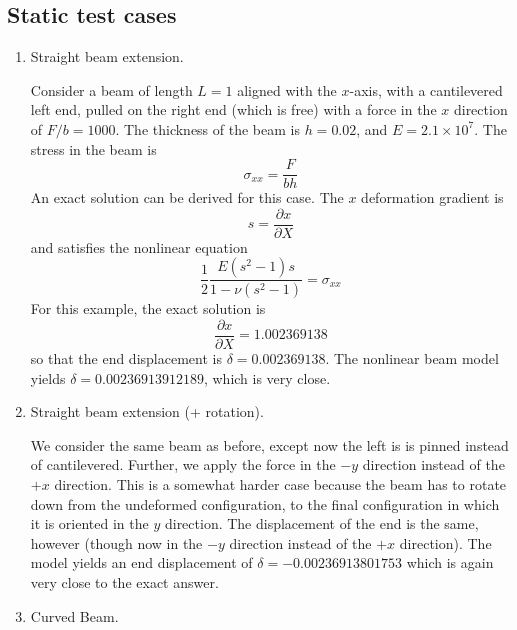 \documentclass{article}
\begin{document}
\subsection{Static test cases}
\begin{enumerate}
\item Straight beam extension.

Consider a beam of length $L=1$ aligned with the $x$-axis, with a cantilevered left end, pulled on the right end (which is free) with a force in the $x$ direction of $F/b = 1000$.
The thickness of the beam is $h = 0.02$, and $E=2.1 \times 10^7$.
The stress in the beam is 
\[ \sigma_{xx} = \frac{F}{bh} \]
An exact solution can be derived for this case.  
The $x$ deformation gradient is
\[ s = \frac{\partial x}{\partial X} \]
and satisfies the nonlinear equation
\begin{equation} \frac{1}{2} \frac{E(s^2-1)s}{1-\nu(s^2-1)} = \sigma_{xx}  \label{eq:eq9900} \end{equation}
For this example, the exact solution is
\[ \frac{\partial x}{\partial X} = 1.002369138 \]
so that the end displacement is $\delta = 0.002369138$.
The nonlinear beam model yields $\delta = 0.00236913912189$, which is very close.

\item Straight beam extension (+ rotation).

We consider the same beam as before, except now the left is is pinned instead of cantilevered.
Further, we apply the force in the $-y$ direction instead of the $+x$ direction.  
This is a somewhat harder case because the beam has to rotate down from the undeformed configuration, to the final configuration in which it is oriented in the $y$ direction.
The displacement of the end is the same, however (though now in the $-y$ direction instead of the $+x$ direction).
The model yields an end displacement of 
$\delta = -0.00236913801753$
which is again very close to the exact answer.

\item Curved Beam.


\end{enumerate}
\end{document}
